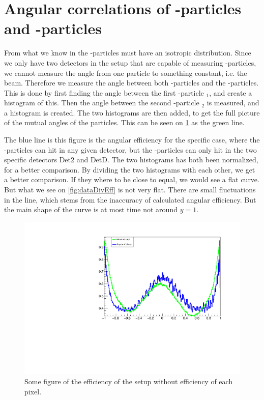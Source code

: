 \section{Angular correlations of \al-particles and \be-particles}
\label{sec:betaAngle}
From what we know in  the \be-particles must have an isotropic distribution. Since we only have two detectors in the setup that are capable of measuring \be-particles, we cannot measure the angle from one particle to something constant, i.e. the beam. Therefore we measure the angle between both \al-particles and the \be-particles.
This is done by first finding the angle between the first \al-particle \al$_1$, and create a histogram of this. Then the angle between the second \al-particle \al$_2$ is measured, and a histogram is created. The two histograms are then added, to get the full picture of the mutual angles of the particles. 
This can be seen on \cref{fig:effwithweight} as the green line.  

The blue line is this figure is the angular efficiency for the specific case, where the \al-particles can hit in any given detector, but the \be-particles can only hit in the two specific detectors Det2 and DetD. The two histograms has both been normalized, for a better comparison. By dividing the two histograms with each other, we get a better comparison. If they where to be close to equal, we would see a flat curve. But what we see on \cref{fig:dataDivEff} is not very flat. 
There are small fluctuations in the line, which stems from the inaccuracy of calculated angular efficiency. But the main shape of the curve is at most time not around $y=1$.

\begin{figure}[h]
	\centering
	\includegraphics[width=\linewidth]{../figures/betaAngles/betaAngle.pdf}
	\caption{Some figure of the efficiency of the setup without efficiency of each pixel. }
	\label{fig:effwithweight}
\end{figure}

